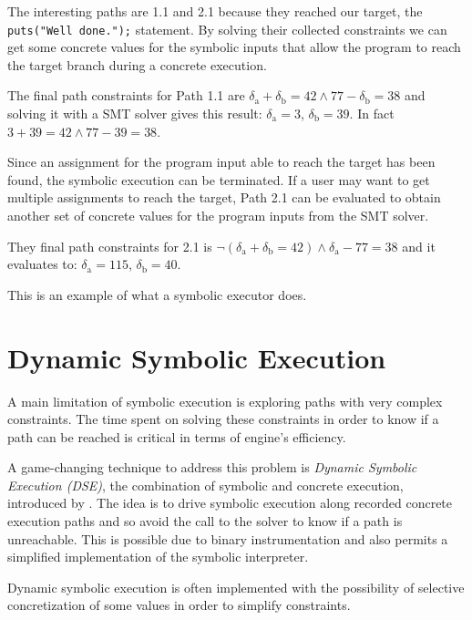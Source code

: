 The interesting paths are 1.1 and 2.1 because they reached our target, the \verb|puts("Well done.");| statement. By solving their collected constraints we can get some concrete values for the symbolic inputs that allow the program to reach the target branch during a concrete execution.

The final path constraints for Path 1.1 are $\delta_{\mathrm{a}} + \delta_{\mathrm{b}} = 42 \land 77 - \delta_{\mathrm{b}} = 38$ and solving it with a SMT solver gives this result: $\delta_{\mathrm{a}} = 3$, $\delta_{\mathrm{b}} = 39$.
In fact $3 + 39 = 42 \land 77 - 39 = 38$.

Since an assignment for the program input able to reach the target has been found, the symbolic execution can be terminated. If a user may want to get multiple assignments to reach the target, Path 2.1 can be evaluated to obtain another set of concrete values for the program inputs from the SMT solver.

They final path constraints for 2.1 is $\neg(\delta_{\mathrm{a}} + \delta_{\mathrm{b}} = 42) \land \delta_{\mathrm{a}} - 77 = 38$ and it evaluates to:  $\delta_{\mathrm{a}} = 115$, $\delta_{\mathrm{b}} = 40$.

This is an example of what a symbolic executor does.

\section{Dynamic Symbolic Execution}

A main limitation of symbolic execution is exploring paths with very complex constraints.
The time spent on solving these constraints in order to know if a path can be reached is critical in terms of engine's efficiency.

A game-changing technique to address this problem is {\em Dynamic Symbolic Execution (DSE)}, the combination of symbolic and concrete execution, introduced by \cite{DART}. The idea is to drive symbolic execution along recorded concrete execution paths and so avoid the call to the solver to know if a path is unreachable. This is possible due to binary instrumentation and also permits a simplified implementation of the symbolic interpreter.


Dynamic symbolic execution is often implemented with the possibility of selective concretization of some values in order to simplify constraints.

